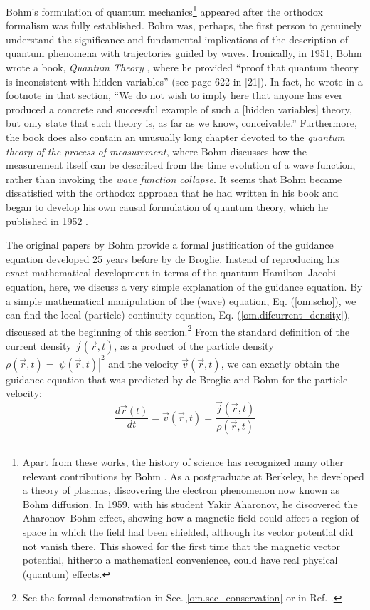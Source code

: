 \documentclass[onecolumn,nofootinbib, secnumarabic, amsmath, nobibnotes,11pt,aps,pra]{revtex4-1}
\newcommand{\sref}[1]{Sec. \ref{#1}}
\newcommand{\eref}[1]{Eq. (\ref{#1})}
\begin{document}
Bohm's formulation of quantum mechanics\footnote{Apart from these
works, the history of science has recognized many other relevant
contributions by Bohm \cite{om.infinite_potential}. As a
postgraduate at Berkeley, he developed a theory of plasmas,
discovering the electron phenomenon now known as Bohm diffusion. In
1959, with his student Yakir Aharonov, he discovered the
Aharonov--Bohm effect, showing how a magnetic field could affect a
region of space in which the field had been shielded, although its
vector potential did not vanish there. This showed for the first
time that the magnetic vector potential, hitherto a mathematical
convenience, could have real physical (quantum) effects.} appeared
after the orthodox formalism was fully established. Bohm was,
perhaps, the first person to genuinely understand the significance
and fundamental implications of the description of quantum phenomena
with trajectories guided by waves. Ironically, in 1951, Bohm wrote a
book, \textit{Quantum Theory} \cite{om.bohmbook}, where he provided
``proof that quantum theory is inconsistent with hidden variables''
(see page 622 in [21]). In fact, he wrote in a footnote in that section,
``We do not wish to imply here that anyone has ever produced a
concrete and successful example of such a [hidden variables] theory,
but only state that such theory is, as far as we know,
conceivable.'' Furthermore, the book does also contain an unusually
long chapter devoted to the \textit{quantum theory of the process of
measurement}, where Bohm discusses how the measurement itself can be
described from the time evolution of a wave function, rather than
invoking the \textit{wave function collapse}. It seems that Bohm
became dissatisfied with the orthodox approach that he had written
in his book and began to develop his own causal formulation of
quantum theory, which he published in 1952
\cite{om.bohm1952a,om.bohm1952b}.

The original papers by Bohm \cite{om.bohm1952a,om.bohm1952b} provide
a formal justification of the guidance equation developed 25 years
before by de Broglie. Instead of reproducing his exact mathematical
development in terms of the quantum Hamilton--Jacobi equation, here, we
discuss a very simple explanation of the guidance equation. By a
simple mathematical manipulation of the (wave) equation,
\eref{om.scho}, we can find the local (particle) continuity
equation, \eref{om.difcurrent_density}, discussed at the beginning
of this section.\footnote{See the formal demonstration in
\sref{om.sec_conservation} or in Ref. \cite{om.cohen}.} From the
standard definition of the current density $\vec{j}(\vec{r},t)$, as
a product of the particle density $\rho(\vec{r},t) =
|\psi(\vec{r},t)|^2$ and the velocity $\vec{v}(\vec{r},t)$, we can
exactly obtain the guidance equation that was predicted by de
Broglie and Bohm for the particle velocity:
\begin{equation}
\label{om.guidance}
\frac{d\vec{r}(t)}{dt} = \vec{v}(\vec{r},t) = \frac{\vec{j}(\vec{r},t)} {\rho(\vec{r},t)}
\end{equation}
\end{document}
